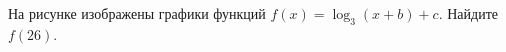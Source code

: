 \begin{ex}
	\begin{condition}
		\begin{minipage}[t]{0.67\textwidth}
			На рисунке изображены графики функций \( f(x)=\log_3(x+b)+c \). Найдите \( f(26) \). 
		\end{minipage}
		\begin{minipage}[c]{0.25\textwidth}
		\end{minipage}
	\end{condition}
\end{ex}